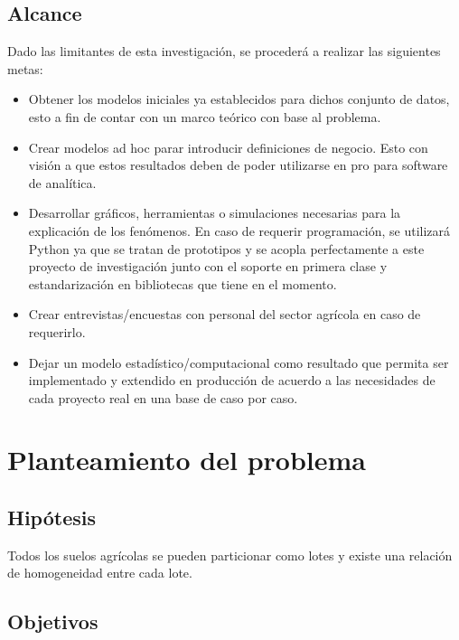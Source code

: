 \documentclass{report}
\begin{document}
\section{Alcance}

Dado las limitantes de esta investigación, se procederá a realizar las siguientes metas:

\begin{itemize}
    \item Obtener los modelos iniciales ya establecidos para dichos conjunto de datos, esto a fin de contar con un marco teórico con base al problema.
    
    \item Crear modelos ad hoc parar introducir definiciones de negocio. Esto con visión a que estos resultados deben de poder utilizarse en pro para software de analítica.
    
    \item Desarrollar gráficos, herramientas o simulaciones necesarias para la explicación de los fenómenos. En caso de requerir programación, se utilizará Python ya que se tratan de prototipos y se acopla perfectamente a este proyecto de investigación junto con el soporte en primera clase y estandarización en bibliotecas que tiene en el momento.
    
    \item Crear entrevistas/encuestas con personal del sector agrícola en caso de requerirlo.
    
    \item Dejar un modelo estadístico/computacional como resultado que permita ser implementado y extendido en producción de acuerdo a las necesidades de cada proyecto real en una base de caso por caso.
\end{itemize}

\bigbreak

\chapter{Planteamiento del problema}

\section{Hipótesis}

Todos los suelos agrícolas se pueden particionar como lotes y existe una relación de homogeneidad entre cada lote.

\section{Objetivos}
\end{document}
